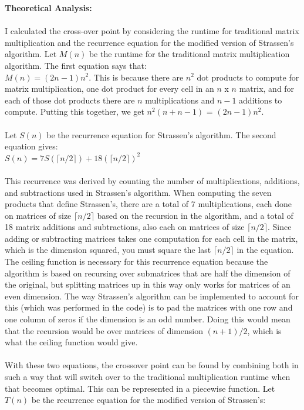\documentclass[11pt]{article}
\begin{document}
\textbf{Theoretical Analysis:} \\\\
I calculated the cross-over point by considering the runtime for traditional matrix multiplication and the recurrence equation for the modified version of Strassen's algorithm. Let $M(n)$ be the runtime for the traditional matrix multiplication algorithm. The first equation says that: \\
$M(n) = (2n - 1)n^2$. This is because there are $n^2$ dot products to compute for matrix multiplication, one dot product for every cell in an $n$ x $n$ matrix, and for each of those dot products there are $n$ multiplications and $n - 1$ additions to compute. Putting this together, we get $n^2(n + n - 1)$ = $(2n - 1)n^2$. \\\\
Let $S(n)$ be the recurrence equation for Strassen's algorithm. The second equation gives: \\
$S(n) = 7S(\lceil n/2\rceil) + 18(\lceil n/2 \rceil)^2$ \\\\
This recurrence was derived by counting the number of multiplications, additions, and subtractions used in Strassen's algorithm. When computing the seven products that define Strassen's, there are a total of 7 multiplications, each done on matrices of size $\lceil n/2 \rceil$ based on the recursion in the algorithm, and a total of 18 matrix additions and subtractions, also each on matrices of size $\lceil n/2 \rceil$. Since adding or subtracting matrices takes one computation for each cell in the matrix, which is the dimension squared, you must square the last $\lceil n/2 \rceil$ in the equation. The ceiling function is necessary for this recurrence equation because the algorithm is based on recursing over submatrices that are half the dimension of the original, but splitting matrices up in this way only works for matrices of an even dimension. The way Strassen's algorithm can be implemented to account for this (which was performed in the code) is to pad the matrices with one row and one column of zeros if the dimension is an odd number. Doing this would mean that the recursion would be over matrices of dimension $(n + 1)/2$, which is what the ceiling function would give. \\\\
With these two equations, the crossover point can be found by combining both in such a way that will switch over to the traditional multiplication runtime when that becomes optimal. This can be represented in a piecewise function. Let $T(n)$ be the recurrence equation for the modified version of Strassen's: \\
\end{document}
